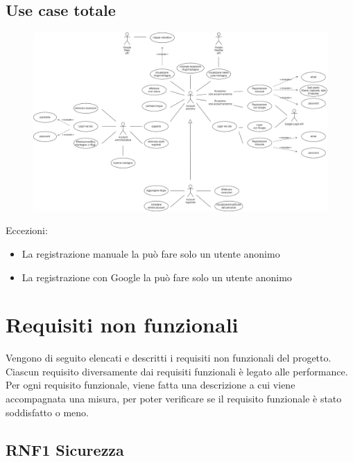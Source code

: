 \documentclass[a4paper,12pt]{article}
\begin{document}
\subsection*{Use case totale}
\begin{figure}[H]
   \centering
    \includegraphics[width=1.29\textwidth, angle = 90]{img-D2/use_case_completo.png}
    
\end{figure}
Eccezioni:
\begin{itemize}
    \item La registrazione manuale la può fare solo un utente anonimo
    \item La registrazione con Google la può fare solo un utente anonimo
\end{itemize}{}



{\newpage}
\section{Requisiti non funzionali}

Vengono di seguito elencati e descritti i requisiti non funzionali del progetto. Ciascun requisito diversamente dai requisiti funzionali è legato alle performance.\\
Per ogni requisito funzionale, viene fatta una descrizione a cui viene accompagnata una misura, per poter verificare se il requisito funzionale è stato soddisfatto o meno.

\subsection*{RNF1 Sicurezza}
\end{document}
